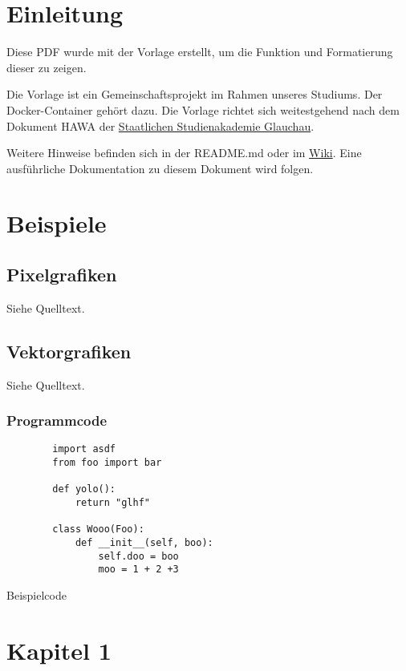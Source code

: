 \section{Einleitung}
Diese PDF wurde mit der Vorlage erstellt, um die Funktion und Formatierung dieser zu zeigen.

Die Vorlage ist ein Gemeinschaftsprojekt im Rahmen unseres Studiums.
Der Docker-Container gehört dazu.
Die Vorlage richtet sich weitestgehend nach dem Dokument \ac{HAWA} der \href{https://www.ba-glauchau.de/}{Staatlichen Studienakademie Glauchau}.

Weitere Hinweise befinden sich in der README.md oder im \href{https://github.com/DSczyrba/Vorlage-Latex/wiki}{Wiki}.
Eine ausführliche Dokumentation zu diesem Dokument wird folgen.

\section{Beispiele}
\subsection{Pixelgrafiken}
Siehe Quelltext.
\subsection{Vektorgrafiken}
Siehe Quelltext.
\subsubsection{Programmcode}
\begin{code}[H]
    \begin{verbatim}
        import asdf
        from foo import bar
        
        def yolo():
            return "glhf"
        
        class Wooo(Foo):
            def __init__(self, boo):
                self.doo = boo
                moo = 1 + 2 +3
    \end{verbatim}
    \caption{Beispielcode}
    \label{code:example}
\end{code}

\section{Kapitel 1}
\blindtext
